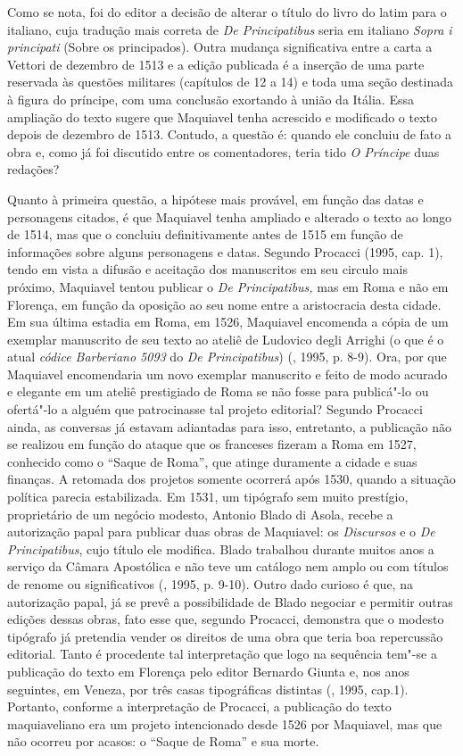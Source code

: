 Como se nota, foi do editor a decisão de alterar o título do livro do
latim para o italiano, cuja tradução mais correta de \emph{De
Principatibus} seria em italiano \emph{Sopra i principati} (Sobre os
principados). Outra mudança significativa entre a carta a Vettori de
dezembro de 1513 e a edição publicada é a inserção de uma parte
reservada às questões militares (capítulos de 12 a 14) e toda uma seção
destinada à figura do príncipe, com uma conclusão exortando à união da
Itália. Essa ampliação do texto sugere que Maquiavel tenha acrescido e
modificado o texto depois de dezembro de 1513. Contudo, a questão é:
quando ele concluiu de fato a obra e, como já foi discutido entre os
comentadores, teria tido \emph{O Príncipe} duas redações?

Quanto à primeira questão, a hipótese mais provável, em função das datas
e personagens citados, é que Maquiavel tenha ampliado e alterado o texto
ao longo de 1514, mas que o concluiu definitivamente antes de 1515 em
função de informações sobre alguns personagens e datas. Segundo Procacci
(1995, cap. 1), tendo em vista a difusão e aceitação dos manuscritos em
seu circulo mais próximo, Maquiavel tentou publicar o \emph{De
Principatibus,} mas em Roma e não em Florença, em função da oposição ao
seu nome entre a aristocracia desta cidade. Em sua última estadia em
Roma, em 1526, Maquiavel encomenda a cópia de um exemplar manuscrito de
seu texto ao ateliê de Ludovico degli Arrighi (o que é o atual
\emph{códice Barberiano 5093} do \emph{De Principatibus}) (,
1995, p. 8-9). Ora, por que Maquiavel encomendaria um novo exemplar
manuscrito e feito de modo acurado e elegante em um ateliê prestigiado
de Roma se não fosse para publicá"-lo ou ofertá"-lo a alguém que
patrocinasse tal projeto editorial? Segundo Procacci ainda, as conversas
já estavam adiantadas para isso, entretanto, a publicação não se
realizou em função do ataque que os franceses fizeram a Roma em 1527,
conhecido como o ``Saque de Roma'', que atinge duramente a cidade e suas
finanças. A retomada dos projetos somente ocorrerá após 1530, quando a
situação política parecia estabilizada. Em 1531, um tipógrafo sem muito
prestígio, proprietário de um negócio modesto, Antonio Blado di Asola,
recebe a autorização papal para publicar duas obras de Maquiavel: os
\emph{Discursos} e o \emph{De Principatibus}, cujo título ele modifica.
Blado trabalhou durante muitos anos a serviço da Câmara Apostólica e não
teve um catálogo nem amplo ou com títulos de renome ou significativos
(, 1995, p. 9-10). Outro dado curioso é que, na autorização
papal, já se prevê a possibilidade de Blado negociar e permitir outras
edições dessas obras, fato esse que, segundo Procacci, demonstra que o
modesto tipógrafo já pretendia vender os direitos de uma obra que teria
boa repercussão editorial. Tanto é procedente tal interpretação que logo
na sequência tem"-se a publicação do texto em Florença pelo editor
Bernardo Giunta e, nos anos seguintes, em Veneza, por três casas
tipográficas distintas (, 1995, cap.1). Portanto, conforme a
interpretação de Procacci, a publicação do texto maquiaveliano era um
projeto intencionado desde 1526 por Maquiavel, mas que não ocorreu por
acasos: o ``Saque de Roma'' e sua morte.

